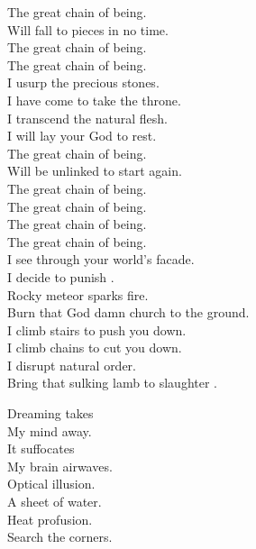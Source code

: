 The great chain of being. \\
Will fall to pieces in no time. \\

The great chain of being. \\
The great chain of being. \\

I usurp the precious stones. \\
I have come to take the throne. \\
I transcend the natural flesh. \\
I will lay your God to rest. \\

The great chain of being. \\
Will be unlinked to start again. \\

The great chain of being. \\
The great chain of being. \\
The great chain of being. \\
The great chain of being. \\

I see through your world's facade. \\
I decide to punish . \\
Rocky meteor sparks fire. \\
Burn that God damn church to the ground. \\

I climb stairs to push you down. \\
I climb chains to cut you down. \\
I disrupt natural order. \\
Bring that sulking lamb to slaughter . \\




Dreaming takes \\
My mind away. \\
It suffocates \\
My brain airwaves. \\

Optical illusion. \\
A sheet of water. \\
Heat profusion. \\
Search the corners. \\

